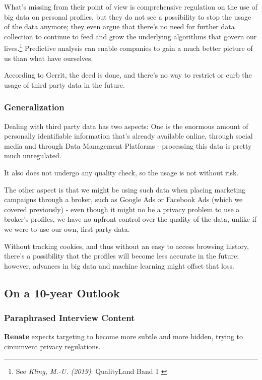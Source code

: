 What's missing from their point of view is comprehensive regulation on the use of big data on personal profiles, but they do not see a possibility to stop the usage of the data anymore; they even argue that there's no need for further data collection to continue to feed and grow the underlying algorithms that govern our lives.\footnote{See \textit{Kling, M.-U. (2019)}: QualityLand Band 1 \cite{qualityLand}} Predictive analysis can enable companies to gain a much better picture of us than what have ourselves.

According to Gerrit, the deed is done, and there's no way to restrict or curb the usage of third party data in the future.

\subsubsection{Generalization}

Dealing with third party data has two aspects: One is the enormous amount of personally identifiable information that's already available online, through social media and through Data Management Platforms - processing this data is pretty much unregulated. 

It also does not undergo any quality check, so the usage is not without risk.

The other aspect is that we might be using such data when placing marketing campaigns through a broker, such as Google Ads or Facebook Ads (which we covered previously) - even though it might no be a privacy problem to use a broker's profiles, we have no upfront control over the quality of the data, unlike if we were to use our own, first party data.

Without tracking cookies, and thus without an easy to access browsing history, there's a possibility that the profiles will become less accurate in the future; however, advances in big data and machine learning might offset that loss.

\subsection{On a 10-year Outlook}

\subsubsection{Paraphrased Interview Content}

\textbf{Renate} expects targeting to become more subtle and more hidden, trying to circumvent privacy regulations.

